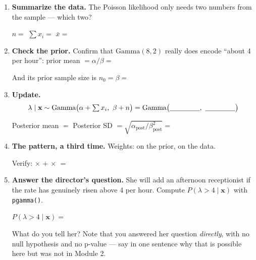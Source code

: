 \documentclass{article}
\newcommand{\blankline}[1]{\underline{\hspace{#1}}}
\begin{document}
\begin{enumerate}[label={\bfseries (\Alph*)},itemsep=.6em]
	\item \textbf{Summarize the data.} The Poisson likelihood only needs two numbers from the sample --- which two?

	\vspace{0.3em}
	$n = $ \blankline{1.5cm} \hspace{1cm} $\sum x_i = $ \blankline{1.5cm} \hspace{1cm} $\bar{x} = $ \blankline{2cm}

	\item \textbf{Check the prior.} Confirm that $\text{Gamma}(8,2)$ really does encode ``about 4 per hour'': prior mean $= \alpha/\beta = $ \blankline{2cm}

	\vspace{0.3em}
	And its prior sample size is $n_0 = \beta = $ \blankline{1.5cm}

	\item \textbf{Update.}
	\[
	\lambda \mid \mathbf{x} \sim \text{Gamma}\big(\alpha + \textstyle\sum x_i,\ \beta + n\big) = \text{Gamma}\big(\blankline{1.5cm},\ \blankline{1.5cm}\big)
	\]

	Posterior mean $=$ \blankline{2.5cm} \hspace{1cm} Posterior SD $= \sqrt{\alpha_{\text{post}}/\beta_{\text{post}}^2} = $ \blankline{2.5cm}

	\item \textbf{The pattern, a third time.} Weights: \blankline{1.5cm} on the prior, \blankline{1.5cm} on the data.

	\vspace{0.3em}
	Verify: \blankline{1.2cm} $\times$ \blankline{1.2cm} $+$ \blankline{1.2cm} $\times$ \blankline{1.2cm} $=$ \blankline{2cm}

	\item \textbf{Answer the director's question.} She will add an afternoon receptionist if the rate has genuinely risen above 4 per hour. Compute $P(\lambda > 4 \mid \mathbf{x})$ with \texttt{pgamma()}.

	$P(\lambda > 4 \mid \mathbf{x}) = $ \blankline{2.5cm}

	\vspace{0.3em}
	What do you tell her? Note that you answered her question \emph{directly}, with no null hypothesis and no p-value --- say in one sentence why that is possible here but was not in Module 2. \\[4em]

\end{enumerate}
\end{document}
